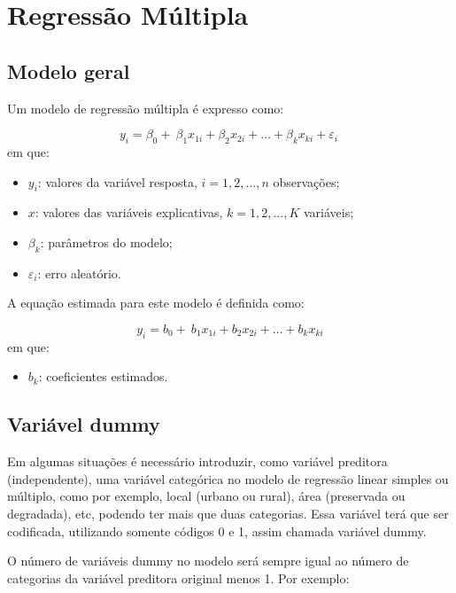 \documentclass[12pt,brazil,]{book}
\providecommand{\tightlist}{%
  \setlength{\itemsep}{0pt}\setlength{\parskip}{0pt}}
\begin{document}
\hypertarget{regressao-multipla}{%
\chapter{Regressão Múltipla}\label{regressao-multipla}}

\hypertarget{modelo-geral}{%
\section{Modelo geral}\label{modelo-geral}}

Um modelo de regressão múltipla é expresso como:

\[ 
y_{i} = \beta_0+\ \beta_1x_{1i}+\beta_2x_{2i}+\dots+\beta_kx_{ki}+\varepsilon_i\ 
\] \noindent em que:

\begin{itemize}
\item
  \(y_{i}\): valores da variável resposta, \(i = 1, 2,..., n\)
  observações;
\item
  \(x\): valores das variáveis explicativas, \(k = 1, 2,..., K\)
  variáveis;
\item
  \(\beta_k\): parâmetros do modelo;
\item
  \(\varepsilon_i\): erro aleatório.
\end{itemize}

A equação estimada para este modelo é definida como:

\[ 
y_{i} = b_0+\ b_1x_{1i}+b_2x_{2i}+\dots+b_kx_{ki} 
\] em que:

\begin{itemize}
\tightlist
\item
  \(b_k\): coeficientes estimados.
\end{itemize}

\hypertarget{variavel-dummy}{%
\section{Variável dummy}\label{variavel-dummy}}

Em algumas situações é necessário introduzir, como variável preditora
(independente), uma variável categórica no modelo de regressão linear
simples ou múltiplo, como por exemplo, local (urbano ou rural), área
(preservada ou degradada), etc, podendo ter mais que duas categorias.
Essa variável terá que ser codificada, utilizando somente códigos 0 e 1,
assim chamada variável dummy.

O número de variáveis dummy no modelo será sempre igual ao número de
categorias da variável preditora original menos 1. Por exemplo:
\end{document}
